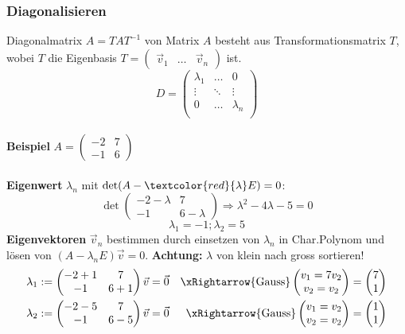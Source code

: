 \subsubsection{Diagonalisieren}\label{charakteristischempolynom}
Diagonalmatrix $A = TAT^{-1}$ von Matrix $A$ besteht aus Transformationsmatrix $T$, wobei $T$ die Eigenbasis $T = \begin{pmatrix}
	\vec{v}_1 & \dots  &\vec{v}_n
\end{pmatrix}$ ist.
\[D = \begin{pmatrix}
	\lambda_1 & \dots & 0 \\
	\vdots & \ddots & \vdots \\
	0 & \dots & \lambda_n \\
\end{pmatrix}\]
~\\
\noindent\textbf{Beispiel}
$A = \begin{pmatrix} -2 & 7 \\ -1 & 6 \end{pmatrix}$
\\ \\
\noindent \textbf{Eigenwert} $\lambda_n$ mit $\det(A - \textcolor{red}{\lambda} E) = 0$:
\[\det\begin{pmatrix}
	-2 - \lambda & 7 \\
	-1 & 6 - \lambda
\end{pmatrix} \Rightarrow \lambda^2 - 4\lambda - 5 = 0\]
\[{\scriptstyle \lambda_1 = -1; \lambda_2 = 5}\]
\noindent \textbf{Eigenvektoren} $\vec{v}_n$ bestimmen durch einsetzen von $\lambda_n$ in Char.Polynom und lösen von $(A - \lambda_n E)\vec{v} = 0$. \textbf{Achtung:} $\lambda$ von klein nach gross sortieren!
\begin{align*}
	\lambda_1 := \begin{pmatrix}
		-2 +1 & 7 \\
		-1 & 6 +1
	\end{pmatrix}\vec{v} &= \vec{0} &\xRightarrow{\text{Gauss}} \begin{pmatrix}
	 v_{1} = 7v_{2} \\
	 v_2 = v_2
\end{pmatrix}  = \begin{pmatrix}
	7 \\1 
\end{pmatrix}\\
 	\lambda_2 := \begin{pmatrix}
		-2 - 5 & 7 \\
		-1 & 6 - 5
	\end{pmatrix}\vec{v} &= \vec{0} &\xRightarrow{\text{Gauss}} \begin{pmatrix}
	v_{1} = v_{2} \\
	v_2 = v_2
\end{pmatrix}= \begin{pmatrix}
1 \\1 
\end{pmatrix}
\end{align*}
